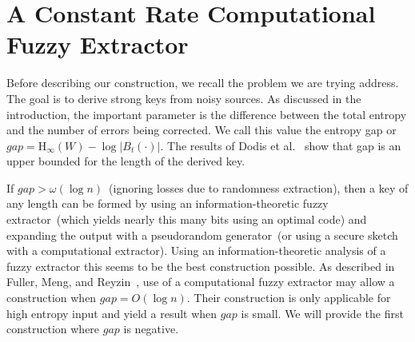 \documentclass[11pt]{article}
\newcommand{\Hoo}{\mathrm{H}_\infty}
\begin{document}
\section{A Constant Rate Computational Fuzzy Extractor}

Before describing our construction, we recall the problem we are trying address.  The goal is to derive strong keys from noisy sources.  As discussed in the introduction, the important parameter is the difference between the total entropy and the number of errors being corrected.  We call this value the entropy gap or $gap= \Hoo(W) - \log|B_t(\cdot)|$.  The results of Dodis et al.~\cite[Lemmas C.1 and C.2]{DBLP:journals/siamcomp/DodisORS08} show that gap is an upper bounded for the length of the derived key. 

If $gap> \omega(\log n)$~(ignoring losses due to randomness extraction), then a key of any length can be formed by using an information-theoretic fuzzy extractor~(which yields nearly this many bits using an optimal code) and expanding the output with a pseudorandom generator~(or using a secure sketch with a computational extractor).  Using an information-theoretic analysis of a fuzzy extractor this seems to be the best construction possible.  As described in Fuller, Meng, and Reyzin~\cite{fuller2013computational}, use of a computational fuzzy extractor may allow a construction when $gap = O(\log n)$.  Their construction is only applicable for high entropy input and yield a result when $gap$ is small.  We will provide the first construction where $gap$ is negative.  
\end{document}
